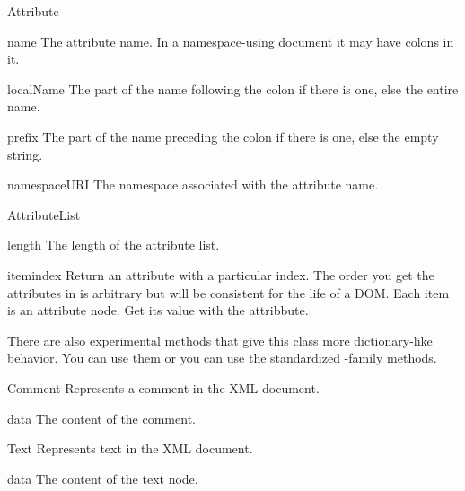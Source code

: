 \begin{classdesc}{Attribute}{}

\begin{memberdesc}{name}
The attribute name.  In a namespace-using document it may have colons
in it.
\end{memberdesc}

\begin{memberdesc}{localName}
The part of the name following the colon if there is one, else the
entire name.
\end{memberdesc}

\begin{memberdesc}{prefix}
The part of the name preceding the colon if there is one, else the
empty string.
\end{memberdesc}

\begin{memberdesc}{namespaceURI}
The namespace associated with the attribute name.
\end{memberdesc}

\end{classdesc}


\begin{classdesc}{AttributeList}{}

\begin{memberdesc}{length}
The length of the attribute list.
\end{memberdesc}

\begin{methoddesc}{item}{index}
Return an attribute with a particular index.  The order you get the
attributes in is arbitrary but will be consistent for the life of a
DOM.  Each item is an attribute node.  Get its value with the
 attribbute.
\end{methoddesc}

There are also experimental methods that give this class more
dictionary-like behavior. You can use them or you can use the
standardized -family methods.

\end{classdesc}


\begin{classdesc}{Comment}{}
Represents a comment in the XML document.

\begin{memberdesc}{data}
The content of the comment.
\end{memberdesc}
\end{classdesc}


\begin{classdesc}{Text}{}
Represents text in the XML document.

\begin{memberdesc}{data}
The content of the text node.
\end{memberdesc}
\end{classdesc}


